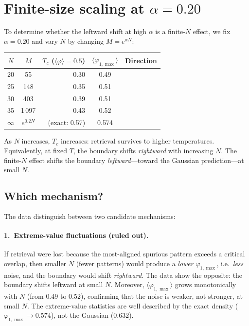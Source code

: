 \documentclass[11pt]{article}
\begin{document}
\section{Finite-size scaling at $\alpha = 0.20$}

To determine whether the leftward shift at high $\alpha$ is a finite-$N$ effect, we fix $\alpha = 0.20$ and vary $N$ by changing $M = e^{\alpha N}$:

\begin{center}
\begin{tabular}{ccrcc}
\toprule
$N$ & $M$ & $T_c$ ($\langle\varphi\rangle = 0.5$) & $\langle\varphi_{1,\max}\rangle$ & Direction \\
\midrule
20 &    55 & 0.30 & 0.49 & \\
25 &   148 & 0.35 & 0.51 & \\
30 &   403 & 0.39 & 0.51 & \\
35 & 1\,097 & 0.43 & 0.52 & \\
\midrule
$\infty$ & $e^{0.2N}$ & (exact: 0.57) & 0.574 & \\
\bottomrule
\end{tabular}
\end{center}

As $N$ increases, $T_c$ increases: retrieval survives to higher temperatures.  Equivalently, at fixed $T$, the boundary shifts \emph{rightward} with increasing $N$.  The finite-$N$ effect shifts the boundary \emph{leftward}---toward the Gaussian prediction---at small $N$.

\subsection{Which mechanism?}

The data distinguish between two candidate mechanisms:

\paragraph{1.\ Extreme-value fluctuations (ruled out).}
If retrieval were lost because the most-aligned spurious pattern exceeds a critical overlap, then smaller $N$ (fewer patterns) would produce a \emph{lower} $\varphi_{1,\max}$, i.e.\ \emph{less} noise, and the boundary would shift \emph{rightward}.  The data show the opposite: the boundary shifts leftward at small $N$.  Moreover, $\langle\varphi_{1,\max}\rangle$ grows monotonically with $N$ (from $0.49$ to $0.52$), confirming that the noise is weaker, not stronger, at small $N$.  The extreme-value statistics are well described by the exact density ($\varphi_{1,\max} \to 0.574$), not the Gaussian ($0.632$).
\end{document}
